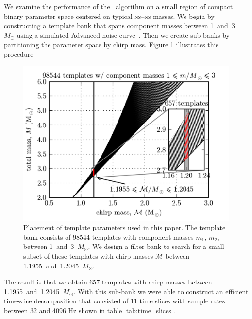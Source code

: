 We examine the performance of the \lloid\ algorithm on a small region of
compact binary parameter space centered on typical \textsc{ns}--\textsc{ns}
masses.  We begin by constructing a template bank that spans component masses
between 1~and~3~$M_\odot$ using a simulated Advanced \LIGO{} noise
curve~\cite{lal}.  Then we create sub-banks by partitioning the parameter space by
chirp mass.  Figure \ref{fig:tmpltbank} illustrates this procedure.
\begin{figure}[htbp]
	\begin{center}
		\includegraphics{figures/tmpltbank.png}
		\caption{\label{fig:tmpltbank}Placement of template parameters used in this paper.  The template bank consists of 98544 templates with component masses $m_1$, $m_2$, between 1~and~3~$M_\odot$.  We design a filter bank to search for a small subset of these templates with chirp masses $\mathcal M$ between 1.1955~and~1.2045~$M_\odot$.}
	\end{center}
\end{figure}
The result is that we obtain 657 templates with chirp masses between 1.1955~and~1.2045~$M_\odot$.  With this
sub-bank we were able to construct an efficient time-slice decomposition that consisted of 11 time slices
with sample rates between 32 and 4096 Hz shown in table \ref{tab:time_slices}.
